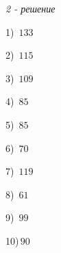 \documentclass{article}
\begin{document}
 
\begin{center} 
   \large{\textit{2 - решение}} 
\end{center}\begin{multicols}{2}
1)$\,\,\,133$ \par 
2)$\,\,\,115$ \par 
3)$\,\,\,109$ \par 
4)$\,\,\,85$ \par 
5)$\,\,\,85$ \par 
6)$\,\,\,70$ \par 
7)$\,\,\,119$ \par 
8)$\,\,\,61$ \par 
9)$\,\,\,99$ \par 
10)$\,90$ \par 
\end{multicols} 
\end{document}
